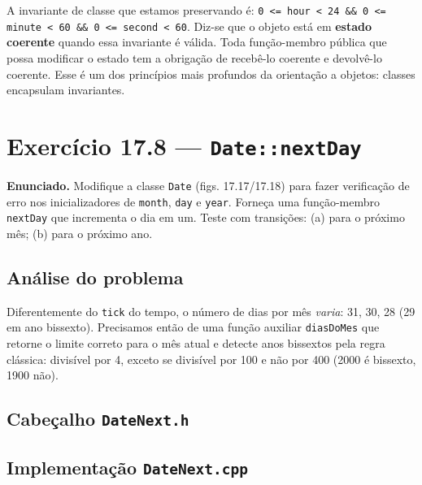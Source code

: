 \documentclass[11pt,a4paper]{article}
\begin{document}
\begin{obseng}
A invariante de classe que estamos preservando \'e: \texttt{0 <= hour < 24 \&\& 0 <= minute < 60 \&\& 0 <= second < 60}. Diz-se que o objeto est\'a em \textbf{estado coerente} quando essa invariante \'e v\'alida. Toda fun\c{c}\~ao-membro p\'ublica que possa modificar o estado tem a obriga\c{c}\~ao de receb\^e-lo coerente e devolv\^e-lo coerente. Esse \'e um dos princ\'ipios mais profundos da orienta\c{c}\~ao a objetos: classes encapsulam invariantes.
\end{obseng}

\newpage
\section{Exerc\'icio 17.8 --- \texttt{Date::nextDay}}

\begin{enunciado}
\textbf{Enunciado.} Modifique a classe \texttt{Date} (figs. 17.17/17.18) para fazer verifica\c{c}\~ao de erro nos inicializadores de \texttt{month}, \texttt{day} e \texttt{year}. Forne\c{c}a uma fun\c{c}\~ao-membro \texttt{nextDay} que incrementa o dia em um. Teste com transi\c{c}\~oes: (a) para o pr\'oximo m\^es; (b) para o pr\'oximo ano.
\end{enunciado}

\subsection*{An\'alise do problema}

Diferentemente do \texttt{tick} do tempo, o n\'umero de dias por m\^es \emph{varia}: 31, 30, 28 (29 em ano bissexto). Precisamos ent\~ao de uma fun\c{c}\~ao auxiliar \texttt{diasDoMes} que retorne o limite correto para o m\^es atual e detecte anos bissextos pela regra cl\'assica: divis\'ivel por 4, exceto se divis\'ivel por 100 e n\~ao por 400 (2000 \'e bissexto, 1900 n\~ao).

\subsection*{Cabe\c{c}alho \texttt{DateNext.h}}



\subsection*{Implementa\c{c}\~ao \texttt{DateNext.cpp}}
\end{document}
